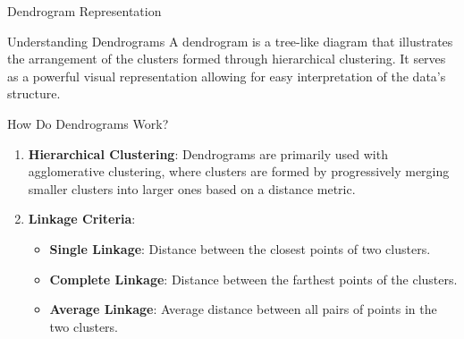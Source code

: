 \documentclass[aspectratio=169]{beamer}
\begin{document}
\begin{frame}[fragile]{Dendrogram Representation}
    \begin{block}{Understanding Dendrograms}
        A dendrogram is a tree-like diagram that illustrates the arrangement of the clusters formed through hierarchical clustering. It serves as a powerful visual representation allowing for easy interpretation of the data's structure.
    \end{block}
\end{frame}

\begin{frame}[fragile]{How Do Dendrograms Work?}
    \begin{enumerate}
        \item \textbf{Hierarchical Clustering}: Dendrograms are primarily used with agglomerative clustering, where clusters are formed by progressively merging smaller clusters into larger ones based on a distance metric.
        \item \textbf{Linkage Criteria}:
        \begin{itemize}
            \item \textbf{Single Linkage}: Distance between the closest points of two clusters.
            \item \textbf{Complete Linkage}: Distance between the farthest points of the clusters.
            \item \textbf{Average Linkage}: Average distance between all pairs of points in the two clusters.
        \end{itemize}
    \end{enumerate}
\end{frame}
\end{document}
